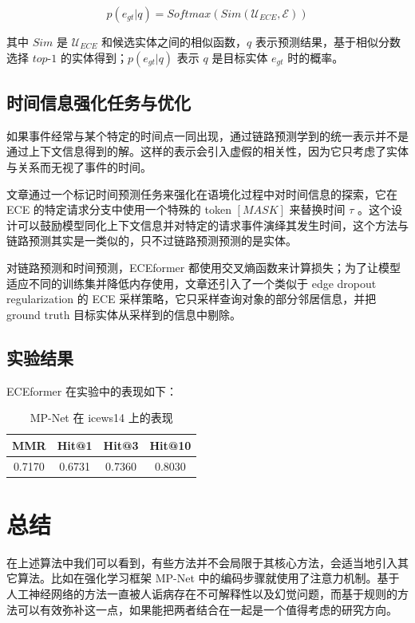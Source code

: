 \documentclass[a4paper, AutoFakeBold]{article}
\begin{document}
\begin{equation}
p(e_{gt}|q)=Softmax(Sim(\mathcal{U}_{ECE},\mathcal{E}))
\end{equation}

其中 $Sim$ 是 $\mathcal{U}_{ECE}$ 和候选实体之间的相似函数，$q$ 表示预测结果，基于相似分数选择 $top\text{-}1$ 的实体得到；$p(e_{gt}|q)$ 表示 $q$ 是目标实体 $e_{gt}$ 时的概率。


\subsection{时间信息强化任务与优化}

如果事件经常与某个特定的时间点一同出现，通过链路预测学到的统一表示并不是通过上下文信息得到的解。这样的表示会引入虚假的相关性，因为它只考虑了实体与关系而无视了事件的时间。

文章通过一个标记时间预测任务来强化在语境化过程中对时间信息的探索，它在 ECE 的特定请求分支中使用一个特殊的 token $[MASK]$ 来替换时间 $\tau$ 。这个设计可以鼓励模型同化上下文信息并对特定的请求事件演绎其发生时间，这个方法与链路预测其实是一类似的，只不过链路预测预测的是实体。

对链路预测和时间预测，ECEformer 都使用交叉熵函数来计算损失；为了让模型适应不同的训练集并降低内存使用，文章还引入了一个类似于 edge dropout regularization 的 ECE 采样策略，它只采样查询对象的部分邻居信息，并把 ground truth 目标实体从采样到的信息中剔除。


\subsection{实验结果}

ECEformer 在实验中的表现如下：




\begin{table}[htbp]
	\centering
	\caption{MP-Net 在 icews14 上的表现}
	\begin{tabular}{cccc}
		\toprule  %
		MMR&Hit@1&Hit@3&Hit@10 \\ 
		\midrule  %
		0.7170&0.6731&0.7360&0.8030 \\
		\bottomrule  %
	\end{tabular}
\end{table}






\section{总结}

在上述算法中我们可以看到，有些方法并不会局限于其核心方法，会适当地引入其它算法。比如在强化学习框架 MP-Net 中的编码步骤就使用了注意力机制。基于人工神经网络的方法一直被人诟病存在不可解释性以及幻觉问题，而基于规则的方法可以有效弥补这一点，如果能把两者结合在一起是一个值得考虑的研究方向。





\end{document}
